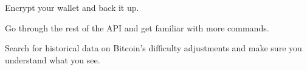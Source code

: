 \begin{exercise}
Encrypt your wallet and back it up.
\end{exercise}

\begin{exercise}
Go through the rest of the API and get familiar with more commands.
\end{exercise}

\begin{exercise}
Search for historical data on Bitcoin's difficulty adjustments and make sure you understand what you see.
\end{exercise}


